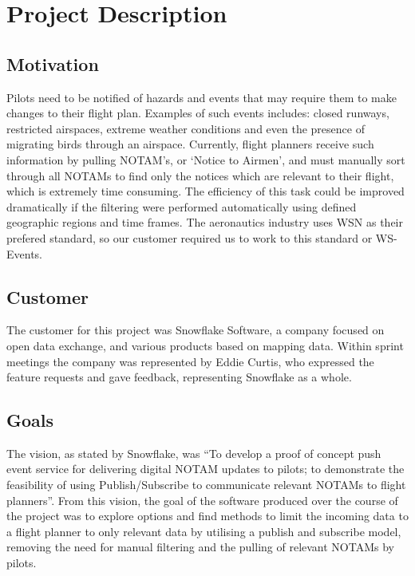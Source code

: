 \documentclass[a4paper, 12pt]{article}
\begin{document}
\newpage

\section{Project Description}
\subsection{Motivation}
Pilots need to be notified of hazards and events that may require them to make changes to their flight plan. Examples of such events includes: closed runways, restricted airspaces, extreme weather conditions and even the presence of migrating birds through an airspace. Currently, flight planners receive such information by pulling NOTAM's, or `Notice to Airmen', and must manually sort through all NOTAMs to find only the notices which are relevant to their flight, which is extremely time consuming. The efficiency of this task could be improved dramatically if the filtering were performed automatically using defined geographic regions and time frames. The aeronautics industry uses WSN as their prefered standard, so our customer required us to work to this standard or WS-Events.

\subsection{Customer}

The customer for this project was Snowflake Software, a company focused on open data exchange, and various products based on mapping data. Within sprint meetings the company was represented by Eddie Curtis, who expressed the feature requests and gave feedback, representing Snowflake as a whole.

\subsection{Goals}

The vision, as stated by Snowflake, was ``To develop a proof of concept push event service for delivering digital NOTAM updates to pilots; to demonstrate the feasibility of using Publish/Subscribe to communicate relevant NOTAMs to flight planners''. From this vision, the goal of the software produced over the course of the project was to explore options and find methods to limit the incoming data to a flight planner to only relevant data by utilising a publish and subscribe model, removing the need for manual filtering and the pulling of relevant NOTAMs by pilots. 
\end{document}
